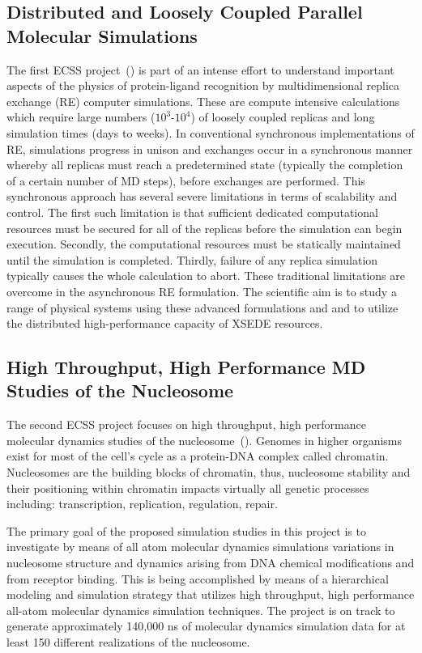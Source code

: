 \documentclass{sig-alternate}
\begin{document}
\subsection{Distributed and Loosely Coupled Parallel Molecular Simulations}
The first ECSS project~(\cite{RonLevy}) is part of an intense effort
to understand important aspects of the physics of protein-ligand
recognition by multidimensional replica exchange (RE) computer
simulations. These are compute intensive calculations which require
large numbers ($10^3$-$10^4$) of loosely coupled replicas and long
simulation times (days to weeks). In conventional synchronous
implementations of RE, simulations progress in unison and exchanges
occur in a synchronous manner whereby all replicas must reach a
predetermined state (typically the completion of a certain number of
MD steps), before exchanges are performed. This synchronous approach
has several severe limitations in terms of scalability and
control. The first such limitation is that sufficient dedicated computational resources must be secured for all of the replicas before the simulation can
begin execution. Secondly, the computational resources must be
statically maintained until the simulation is completed. Thirdly,
failure of any replica simulation typically causes the whole
calculation to abort. These traditional limitations are overcome
in the asynchronous RE formulation. The scientific aim is to study a
range of physical systems using these advanced formulations and and to
utilize the distributed high-performance capacity of XSEDE resources.

\subsection{High Throughput, High Performance MD Studies of the
  Nucleosome}

The second ECSS project focuses on high throughput, high performance
molecular dynamics studies of the
nucleosome~(\cite{TomBishop}). Genomes in higher organisms exist for
most of the cell's cycle as a protein-DNA complex called chromatin.
Nucleosomes are the building blocks of chromatin, thus, nucleosome
stability and their positioning within chromatin impacts virtually all
genetic processes including: transcription, replication, regulation,
repair.

The primary goal of the proposed simulation studies in this project is to
investigate by means of all atom molecular dynamics simulations variations in
nucleosome structure and dynamics arising from DNA chemical modifications and
from receptor binding. This is being accomplished by means of a hierarchical
modeling and simulation strategy that utilizes high throughput, high
performance all-atom molecular dynamics simulation techniques. The project is
on track to generate approximately 140,000 ns of molecular dynamics simulation
data for at least 150 different realizations of the nucleosome.
\end{document}
